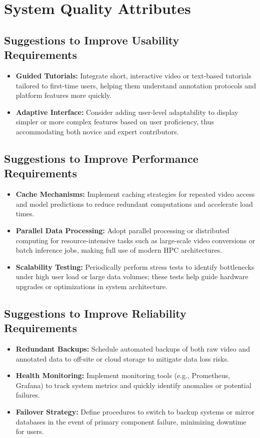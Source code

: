\section{System Quality Attributes}

\subsection{Suggestions to Improve Usability Requirements}
\begin{itemize}
    \item \textbf{Guided Tutorials:} Integrate short, interactive video or text-based tutorials tailored to first-time users, helping them understand annotation protocols and platform features more quickly.
    \item \textbf{Adaptive Interface:} Consider adding user-level adaptability to display simpler or more complex features based on user proficiency, thus accommodating both novice and expert contributors.
\end{itemize}

\subsection{Suggestions to Improve Performance Requirements}
\begin{itemize}
    \item \textbf{Cache Mechanisms:} Implement caching strategies for repeated video access and model predictions to reduce redundant computations and accelerate load times.
    \item \textbf{Parallel Data Processing:} Adopt parallel processing or distributed computing for resource-intensive tasks such as large-scale video conversions or batch inference jobs, making full use of modern HPC architectures.
    \item \textbf{Scalability Testing:} Periodically perform stress tests to identify bottlenecks under high user load or large data volumes; these tests help guide hardware upgrades or optimizations in system architecture.
\end{itemize}

\subsection{Suggestions to Improve Reliability Requirements}
\begin{itemize}
    \item \textbf{Redundant Backups:} Schedule automated backups of both raw video and annotated data to off-site or cloud storage to mitigate data loss risks.
    \item \textbf{Health Monitoring:} Implement monitoring tools (e.g., Prometheus, Grafana) to track system metrics and quickly identify anomalies or potential failures.
    \item \textbf{Failover Strategy:} Define procedures to switch to backup systems or mirror databases in the event of primary component failure, minimizing downtime for users.
\end{itemize}

